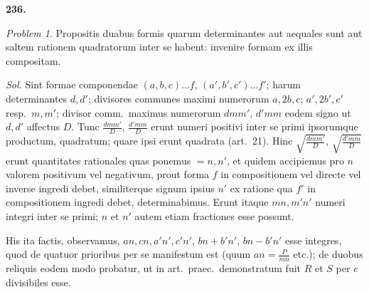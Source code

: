 \documentclass[12pt,a4paper]{article}
\theoremstyle{plain}
\theoremstyle{definition}
\theoremstyle{remark}
\theoremstyle{problemstyle}
\newtheorem{problem}{Problem}[section]
\begin{document}
\textbf{236.}

\begin{problem}
Propositis duabus formis quarum determinantes aut aequales sunt aut saltem rationem quadratorum inter se habent: invenire formam ex illis compositam.
\end{problem}

\emph{Sol.} Sint formae componendae $(a, b, c) \ldots f$, $(a', b', c') \ldots f'$; harum determinantes $d, d'$; divisores communes maximi numerorum $a, 2b, c$; $a', 2b', c'$ resp.\ $m, m'$; divisor comm.\ maximus numerorum $dmm'$, $d'mm$ eodem signo ut $d, d'$ affectus $D$. Tunc $\frac{dmm'}{D}$, $\frac{d'mm}{D}$ erunt numeri positivi inter se primi ipsorumque productum, quadratum; quare ipsi erunt quadrata (art.\ 21). Hinc $\sqrt{\frac{dmm'}{D}}$, $\sqrt{\frac{d'mm}{D}}$ erunt quantitates rationales quas ponemus $= n, n'$, et quidem accipiemus pro $n$ valorem positivum vel negativum, prout forma $f$ in compositionem vel directe vel inverse ingredi debet, similiterque signum ipsius $n'$ ex ratione qua $f'$ in compositionem ingredi debet, determinabimus. Erunt itaque $mn, m'n'$ numeri integri inter se primi; $n$ et $n'$ autem etiam fractiones esse possunt.

His ita factis, observamus, $an, cn, a'n', c'n'$, $bn + b'n'$, $bn - b'n'$ esse integres, quod de quatuor prioribus per se manifestum est (quum $an = \tfrac{P}{mn}$ etc.); de duobus reliquis eodem modo probatur, ut in art.\ praec.\ demonstratum fuit $R$ et $S$ per $e$ divisibiles esse.
\end{document}
